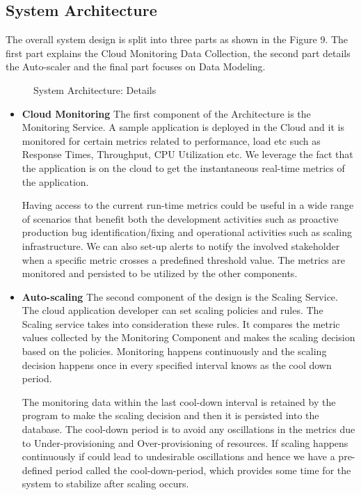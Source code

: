 \documentclass[article,type=msc,colorback,12pt,accentcolor=tud7b,table]{tudthesis}
\begin{document}
 \subsection{System Architecture }
 	The overall system design is split into three parts as shown in the Figure 9. The first part explains the Cloud Monitoring Data Collection, the second part details the Auto-scaler and the final part focuses on Data Modeling. 			
 	
 			 \begin{figure}
 			 	\begin{center}
 			 		\makebox[\textwidth]{\texttt{[image: C2]}}
 			 	\end{center}
 			 	\caption{System Architecture: Details}
 			 \end{figure}
 	
 	 \begin{itemize}
 	 	\item{\textbf{Cloud Monitoring}} 
 	 	\newline   The first component of the Architecture is the Monitoring Service. A sample application is deployed in the Cloud and it is monitored for certain metrics related to performance, load etc such as Response Times, Throughput, CPU Utilization etc. We leverage the fact that the application is on the cloud to get the instantaneous real-time metrics of the application. 
 	 	\par Having access to the current run-time metrics could be useful in a wide range of scenarios that benefit both the development activities such as proactive production bug identification/fixing and operational activities such as scaling infrastructure. We can also set-up alerts to notify the involved stakeholder when a specific metric crosses a predefined threshold value. The metrics are monitored and persisted to be utilized by the other components. 
 	 	
 	 	\item {\textbf{Auto-scaling}} 
 	 	\newline The second component of the design is the Scaling Service. The cloud application developer can set scaling policies and rules. The Scaling service takes into consideration these rules. It compares the metric values collected by the Monitoring Component and makes the scaling decision based on the policies. Monitoring happens continuously and the scaling decision happens once in every specified interval knows as the cool down period. 
 	 	\par The monitoring data within the last cool-down interval is retained by the program to make the scaling decision and then it is persisted into the database. The cool-down period is to avoid any oscillations in the metrics due to Under-provisioning and Over-provisioning of resources. If scaling happens continuously if could lead to undesirable oscillations and hence we have a pre-defined period called the cool-down-period, which provides some time for the system to stabilize after scaling occurs. 
 	 	

\end{itemize}
\end{document}

